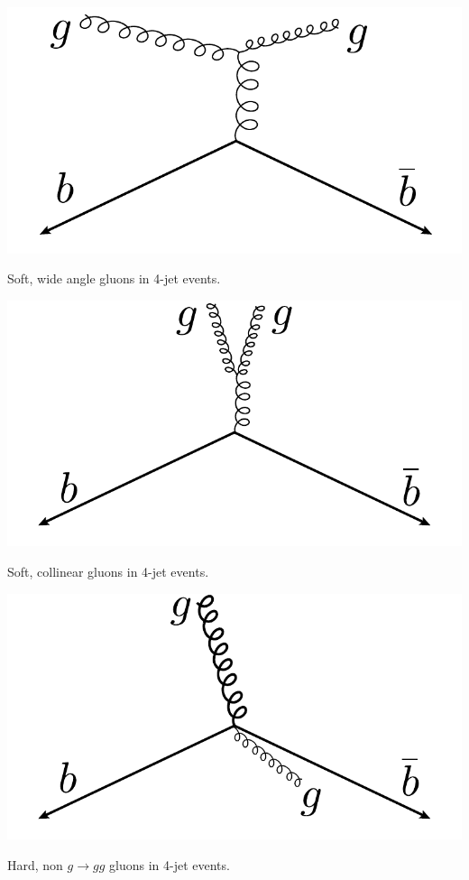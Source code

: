\begin{marginfigure}[-2cm]
  \centerfloat
  \includegraphics[width=1.1\textwidth]{figures/R_kt_CA/soft_wide_angle.pdf}
  \caption[Soft Wide Angle Gluons in 4-Jet Events]
          {Soft, wide angle gluons in 4-jet events.} 
  \label{fig:q:kt_CA_soft_wide}
\end{marginfigure}


\begin{marginfigure}[1cm]
  \centerfloat
  \includegraphics[width=1.1\textwidth]{figures/R_kt_CA/soft_collinear.pdf}
  \caption[Soft Collinear Gluons in 4-Jet Events]
          {Soft, collinear gluons in 4-jet events.} 
  \label{fig:q:kt_CA_soft_collinear}
\end{marginfigure}

\begin{marginfigure}[1cm]
  \centerfloat
  \includegraphics[width=1.1\textwidth]{figures/R_kt_CA/hard_non_g_to_gg.pdf}
  \caption[Hard Non $g\rightarrow gg$ Gluons in 4-Jet Events]
          {Hard, non $g\rightarrow gg$ gluons in 4-jet events.} 
  \label{fig:q:kt_CA_hard_non_g_to_gg}
\end{marginfigure}

